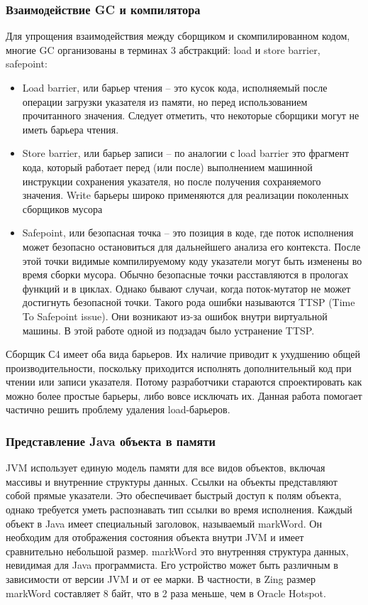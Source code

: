 \subsubsection{Взаимодействие GC и компилятора}
Для упрощения взаимодействия между сборщиком и скомпилированном кодом, многие GC организованы в терминах 3 абстракций: load и store barrier, safepoint\cite{gc-llvm}:
\begin{itemize}
	\item Load barrier, или барьер чтения – это кусок кода, исполняемый после операции загрузки указателя из памяти, но перед использованием прочитанного значения. Следует отметить, что некоторые сборщики могут не иметь барьера чтения.
	\item Store barrier, или барьер записи  – по аналогии с load barrier это фрагмент кода, который работает перед (или после) выполнением машинной инструкции сохранения указателя, но после получения сохраняемого значения.
	Write барьеры широко применяются для реализации поколенных сборщиков мусора
	\item Safepoint, или безопасная точка – это позиция в коде, где поток исполнения может безопасно остановиться для дальнейшего анализа его контекста. После этой точки видимые компилируемому коду указатели могут быть изменены во время сборки мусора\cite{gc-handbook}. 
	Обычно безопасные точки расставляются в прологах функций и в циклах. Однако бывают случаи, когда поток-мутатор не может достигнуть безопасной точки. Такого рода ошибки называются TTSP (Time To Safepoint issue). 
	Они возникают из-за ошибок внутри виртуальной машины. В этой работе одной из подзадач было устранение TTSP.
\end{itemize}
Сборщик С4 имеет оба вида барьеров. Их наличие приводит к ухудшению общей производительности, поскольку приходится исполнять дополнительный код при чтении или записи указателя. 
Потому разработчики стараются спроектировать как можно более простые барьеры, либо вовсе исключать их. 
Данная работа помогает частично решить проблему удаления load-барьеров.

\subsubsection{Представление Java объекта в памяти}
JVM использует единую модель памяти для все видов объектов, включая массивы и внутренние структуры данных. 
Ссылки на объекты представляют собой прямые указатели. Это обеспечивает быстрый доступ к полям объекта, однако требуется уметь распознавать тип ссылки во время исполнения. 
Каждый объект в Java имеет специальный заголовок, называемый markWord. Он необходим для отображения состояния объекта внутри JVM и имеет сравнительно небольшой размер. 
markWord это внутренняя структура данных, невидимая для Java программиста. Его устройство может быть различным в зависимости от версии JVM и от ее марки. 
В частности, в Zing размер markWord составляет 8 байт, что в 2 раза меньше, чем в Oracle Hotspot. 

